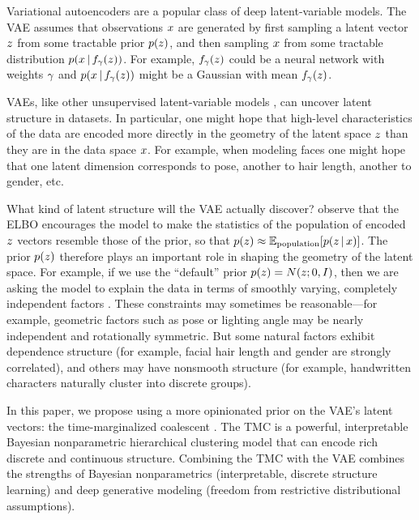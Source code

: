 Variational autoencoders \citep[VAEs; ][]{Kingma2014,Rezende2014} are a popular class of deep latent-variable models. The VAE assumes that observations $x$ are generated by first sampling a latent vector $z$ from some tractable prior $p(z)$, and then sampling $x$ from some tractable distribution $p(x \,|\, f_\gamma(z))$.
For example, $f_\gamma(z)$ could be a neural network with weights $\gamma$ and $p(x \,|\, f_\gamma(z))$ might be a Gaussian with mean $f_\gamma(z)$.

VAEs, like other unsupervised latent-variable models \citep[e.g.; ][]{Tipping1999,Blei2003}, can uncover latent structure in datasets.
In particular, one might hope that high-level characteristics of the data are encoded more directly in the geometry of the latent space $z$ than they are in the data space $x$. For example, when modeling faces one might hope that one latent dimension corresponds to pose, another to hair length, another to gender, etc. 

What kind of latent structure will the VAE actually discover?
\citet{Hoffman2016} observe that the ELBO encourages the model to make the statistics of the population of encoded $z$ vectors resemble those of the prior, so that $p(z)\approx \mathbb{E}_\mathrm{population}[p(z \,|\, x)]$.
The prior $p(z)$ therefore plays an important role in shaping the geometry of the latent space.
For example, if we use the ``default'' prior $p(z)=N(z; 0, I)$, then we are asking the model to explain the data in terms of smoothly varying, completely independent factors \citep{Burgess2018}. These constraints may sometimes be reasonable---for example, geometric factors such as pose or lighting angle may be nearly independent and rotationally symmetric. But some natural factors exhibit dependence structure (for example, facial hair length and gender are strongly correlated), and others may have nonsmooth structure (for example, handwritten characters naturally cluster into discrete groups).

In this paper, we propose using a more opinionated prior on the VAE's latent vectors: the time-marginalized coalescent \citep[TMC; ][]{Boyles2012}.
The TMC is a powerful, interpretable Bayesian nonparametric hierarchical clustering model that can encode rich discrete and continuous structure.
Combining the TMC with the VAE combines the strengths of Bayesian nonparametrics (interpretable, discrete structure learning) and deep generative modeling (freedom from restrictive distributional assumptions).


